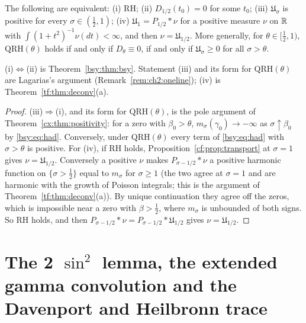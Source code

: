 \begin{corollary}\label{bsy:cor:equiv}
The following are equivalent: (i) RH; (ii) $D_{1/2}(t_0)=0$ for some $t_0$; (iii) $\mathfrak U_\sigma$ is positive for every $\sigma\in(\frac12,1)$; (iv) $\mathfrak U_1=P_{1/2}*\nu$ for a positive measure $\nu$ on $\mathbb{R}$ with $\int(1+t^2)^{-1}\nu(dt)<\infty$, and then $\nu=\mathfrak U_{1/2}$. More generally, for $\theta\in[\frac12,1)$, $\mathrm{QRH}(\theta)$ holds if and only if $D_\theta\equiv0$, if and only if $\mathfrak U_\sigma\ge0$ for all $\sigma>\theta$.
\end{corollary}

\noindent (i)$\Leftrightarrow$(ii) is Theorem~\ref{bsy:thm:bsy}. Statement (iii) and its form for $\mathrm{QRH}(\theta)$ are Lagarias's argument (Remark~\ref{rem:ch2:oneline}); (iv) is Theorem~\ref{tf:thm:deconv}(a).

\begin{proof}
(iii)$\Rightarrow$(i), and its form for $\mathrm{QRH}(\theta)$, is the pole argument of Theorem~\ref{cx:thm:positivity}: for a zero with $\beta_0>\theta$, $m_\sigma(\gamma_0)\to-\infty$ as $\sigma\uparrow\beta_0$ by \eqref{bsy:eq:had}. Conversely, under $\mathrm{QRH}(\theta)$ every term of \eqref{bsy:eq:had} with $\sigma>\theta$ is positive. For (iv), if $\mathrm{RH}$ holds, Proposition~\ref{cf:prop:transport} at $\sigma=1$ gives $\nu=\mathfrak U_{1/2}$. Conversely a positive $\nu$ makes $P_{\sigma-1/2}*\nu$ a positive harmonic function on $\{\sigma>\frac12\}$ equal to $m_\sigma$ for $\sigma\ge1$ (the two agree at $\sigma=1$ and are harmonic with the growth of Poisson integrals; this is the argument of Theorem~\ref{tf:thm:deconv}(a)). By unique continuation they agree off the zeros, which is impossible near a zero with $\beta>\frac12$, where $m_\sigma$ is unbounded of both signs. So RH holds, and then $P_{\sigma-1/2}*\nu=P_{\sigma-1/2}*\mathfrak U_{1/2}$ gives $\nu=\mathfrak U_{1/2}$.
\end{proof}

\section[The 2 sin squared lemma, EGGC and Davenport and Heilbronn]{The 2 \texorpdfstring{$\sin^2$}{sin squared} lemma, the extended gamma convolution and the Davenport and Heilbronn trace}\label{bsy:sec:sin2}


